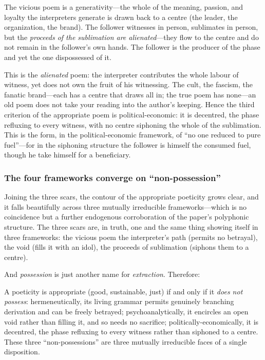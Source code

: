 The vicious poem is a  generativity---the whole of the meaning, passion, and loyalty the interpreters generate is drawn back to a centre (the leader, the organization, the brand). The follower witnesses in person, sublimates in person, but the \emph{proceeds of the sublimation are alienated}---they flow to the centre and do not remain in the follower's own hands. The follower is the producer of the phase and yet the one dispossessed of it.

\begin{claim}
This is the \emph{alienated} poem: the interpreter contributes the whole labour of witness, yet does not own the fruit of his witnessing. The cult, the fascism, the fanatic brand---each has a centre that draws all in; the true poem has none---an old poem does not take your reading into the author's keeping. Hence the third criterion of the appropriate poem is political-economic: it is decentred, the phase refluxing to every witness, with no centre siphoning the whole of the sublimation. This is the form, in the political-economic framework, of ``no one reduced to pure fuel''---for in the siphoning structure the follower is himself the consumed fuel, though he take himself for a beneficiary.
\end{claim}

\subsubsection{The four frameworks converge on ``non-possession''}

Joining the three scars, the contour of the appropriate poeticity grows clear, and it falls beautifully across three mutually irreducible frameworks---which is no coincidence but a further endogenous corroboration of the paper's polyphonic structure. The three scars are, in truth, one and the same thing showing itself in three frameworks: the vicious poem  the interpreter's path (permits no betrayal),  the void (fills it with an idol),  the proceeds of sublimation (siphons them to a centre).

And \emph{possession} is just another name for \emph{extraction}. Therefore:

\begin{claim}
A poeticity is appropriate (good, sustainable, just) if and only if it \emph{does not possess}: hermeneutically, its living grammar permits genuinely branching derivation and can be freely betrayed; psychoanalytically, it encircles an open void rather than filling it, and so needs no sacrifice; politically-economically, it is decentred, the phase refluxing to every witness rather than siphoned to a centre. These three ``non-possessions'' are three mutually irreducible faces of a single disposition.
\end{claim}

